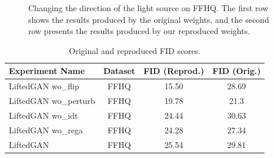 \begin{figure}[t]
    \centering
    \caption{Changing the direction of the light source on FFHQ. The first row shows the results produced by the original weights, and the second row presents the results produced by our reproduced weights.}
    \label{fig:lighting}
\end{figure}



\begin{table}[b!]
\centering
\caption{Original and reproduced FID scores.}
\begin{tabular}{|l|c|c|c|}
\hline
\textbf{Experiment Name} & \multicolumn{1}{l|}{\textbf{Dataset}} & \multicolumn{1}{l|}{\textbf{FID (Reprod.)}} & \multicolumn{1}{l|}{\textbf{FID (Orig.)}} \\ \hline
LiftedGAN wo\_flip        & FFHQ                                  & 15.50                             & 28.69                                    \\ \hline
LiftedGAN wo\_perturb     & FFHQ                                  & 19.78                             & 21.3                                    \\ \hline
LiftedGAN wo\_idt         & FFHQ                                  & 24.44                             & 30.63                                 \\ \hline
LiftedGAN wo\_rega        & FFHQ                                  & 24.28                              & 27.34                                      \\ \hline
LiftedGAN                 & FFHQ                                  & 25.54                             & 29.81                                  \\ \hline
\end{tabular}
\label{tab:fid}
\end{table}

